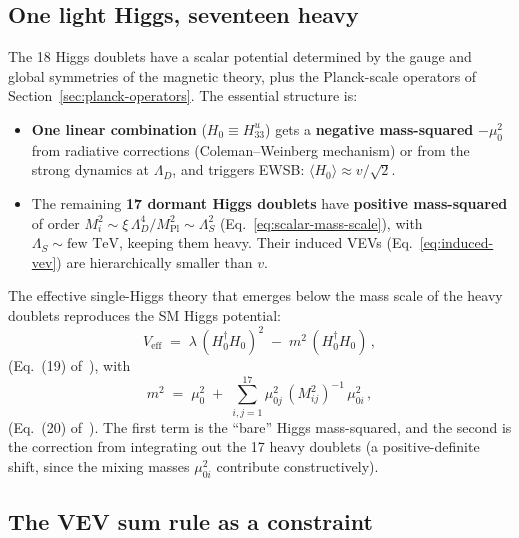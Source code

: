 \documentclass[11pt,a4paper]{article}
\begin{document}
\subsection{One light Higgs, seventeen heavy}

The 18 Higgs doublets have a scalar potential determined by the
gauge and global symmetries of the magnetic theory, plus the
Planck-scale operators of Section~\ref{sec:planck-operators}.  The
essential structure is:
\begin{itemize}
  \item \textbf{One linear combination}
    ($H_0 \equiv H_{33}^u$) gets a \textbf{negative mass-squared}
    $-\mu_0^2$ from radiative corrections (Coleman--Weinberg mechanism)
    or from the strong dynamics at $\Lambda_D$, and triggers EWSB:
    $\langle H_0 \rangle \approx v/\sqrt{2}$.
  \item The remaining \textbf{17 dormant Higgs doublets}
    have \textbf{positive mass-squared} of order
    $M_i^2 \sim \xi\, \Lambda_D^4 / M_{\text{Pl}}^2 \sim \Lambda_S^2$
    (Eq.~\eqref{eq:scalar-mass-scale}), with
    $\Lambda_S \sim \text{few TeV}$, keeping them heavy.  Their induced VEVs (Eq.~\eqref{eq:induced-vev}) are
    hierarchically smaller than $v$.
\end{itemize}

The effective single-Higgs theory that emerges below the mass scale of
the heavy doublets reproduces the SM Higgs potential:
\begin{equation}\label{eq:sm-potential}
  V_{\text{eff}} \;=\;
  \lambda\, (H_0^\dagger H_0)^2
  \;-\; m^2\, (H_0^\dagger H_0)\,,
\end{equation}
(Eq.~(19) of~\cite{CacciapagliaSannino2024}), with
\begin{equation}\label{eq:effective-mass}
  m^2 \;=\; \mu_0^2
  \;+\; \sum_{i,j=1}^{17}
  \mu_{0j}^2\, (M_{ij}^2)^{-1}\, \mu_{0i}^2\,,
\end{equation}
(Eq.~(20) of~\cite{CacciapagliaSannino2024}).
The first term is the ``bare'' Higgs mass-squared, and the second is
the correction from integrating out the 17 heavy doublets (a
positive-definite shift, since the mixing masses $\mu_{0i}^2$
contribute constructively).

\subsection{The VEV sum rule as a constraint}
\end{document}
